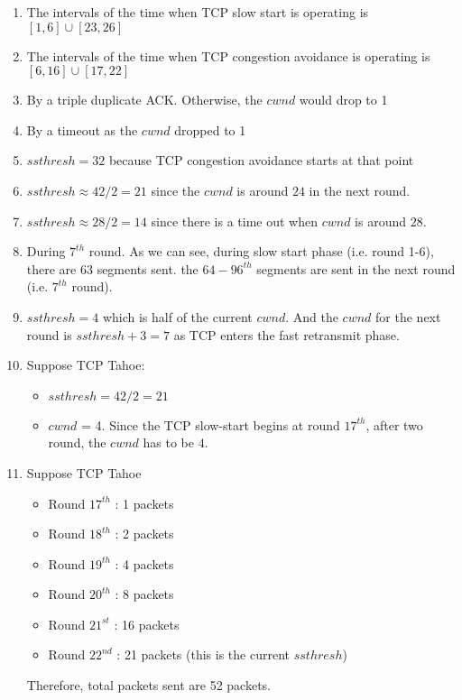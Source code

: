 \documentclass[11pt]{article}
\newenvironment{problem}[2][Problem]{\begin{trivlist}
\item[\hskip \labelsep {\bfseries #1}\hskip \labelsep {\bfseries #2.}]}{\end{trivlist}}
\begin{document}
\begin{problem}{2}
\end{problem}
\begin{enumerate}
	\item[a.] The intervals of the time when TCP slow start is operating is $[1,6]\cup[23,26]$
	\item[b.] The intervals of the time when TCP congestion avoidance is operating is $[6,16]\cup [17,22]$
	\item[c.] By a triple duplicate ACK. Otherwise, the $cwnd$ would drop to 1
	\item[d.] By a timeout as the $cwnd$ dropped to 1
	\item[e.] $ssthresh= 32$ because TCP congestion avoidance starts at that point
	\item[f.] $ssthresh\approx 42/2 = 21$ since the $cwnd$ is around $24$ in the next round. 
	\item[g.] $ssthresh \approx 28/2 = 14$ since there is a time out when $cwnd$ is around $28$.
	\item[h.] During $7^{th}$ round. As we can see, during slow start phase (i.e. round 1-6), there are 63 segments sent. the $64-96^{th}$ segments are sent in the next round (i.e. $7^{th}$ round).
	\item[i.] $ssthresh=4$ which is half of the current $cwnd$. And the $cwnd$ for the next round is $ssthresh+3=7$ as TCP enters the fast retransmit phase.
	\item[j.] Suppose TCP Tahoe:
	\begin{itemize}
		\item $ssthresh = 42/2 = 21$
		\item $cwnd$ = 4. Since the TCP slow-start begins at round $17^{th}$, after two round, the $cwnd$ has to be $4$.
	\end{itemize}
	\item[k.] Suppose TCP Tahoe
	\begin{itemize}
		\item Round $17^{th}$ : 1 packets
		\item Round $18^{th}$ : 2 packets
		\item Round $19^{th}$ : 4 packets
		\item Round $20^{th}$ : 8 packets
		\item Round $21^{st}$ : 16 packets
		\item Round $22^{nd}$ : 21 packets (this is the current $ssthresh$)
	\end{itemize}
	Therefore, total packets sent are 52 packets.
\end{enumerate}
\end{document}
